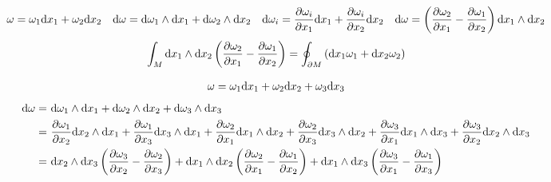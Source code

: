 \documentclass[11pt]{article}
\numberwithin{equation}{section}
\begin{document}
\begin{ex}
\begin{align}
  \w
=
  \w_1
  \mr{d}x_1
+
  \w_2
  \mr{d}x_2
&&
  \mr{d}\w
=
  \mr{d}\w_1\wedge\mr{d}x_1
+
  \mr{d}\w_2\wedge\mr{d}x_2
&&
  \mr{d}\w_i
=
  \pd{\w_i}{x_1}
  \mr{d}x_1
+
  \pd{\w_i}{x_2}
  \mr{d}x_2
&&
  \mr{d}\w
=
  \pr{
    \pd{\w_2}{x_1}
  -
    \pd{\w_1}{x_2}
  }
  \mr{d}x_1\wedge\mr{d}x_2
\end{align}
\begin{align}
  \int_M
  \mr{d}x_1\wedge\mr{d}x_2
  \pr{
    \pd{\w_2}{x_1}
  -
    \pd{\w_1}{x_2}
  }
=
  \oint_{\pt M}
  \pr{
    \mr{d}x_1
    \w_1
  +
    \mr{d}x_2
    \w_2
  }
\end{align}
\end{ex}

\begin{ex}
\begin{align}
  \w
=
  \w_1
  \mr{d}x_1
+
  \w_2
  \mr{d}x_2
+
  \w_3
  \mr{d}x_3
\end{align}
\begin{align}
  \mr{d}\w
=&\
  \mr{d}\w_1
  \wedge
  \mr{d}x_1
+
  \mr{d}\w_2
  \wedge
  \mr{d}x_2
+
  \mr{d}\w_3
  \wedge
  \mr{d}x_3
\\=&\
  \pd{\w_1}{x_2}
  \mr{d}x_2
  \wedge
  \mr{d}x_1
+
  \pd{\w_1}{x_3}
  \mr{d}x_3
  \wedge
  \mr{d}x_1
+
  \pd{\w_2}{x_1}
  \mr{d}x_1
  \wedge
  \mr{d}x_2
+
  \pd{\w_2}{x_3}
  \mr{d}x_3
  \wedge
  \mr{d}x_2
+
  \pd{\w_3}{x_1}
  \mr{d}x_1
  \wedge
  \mr{d}x_3
+
  \pd{\w_3}{x_2}
  \mr{d}x_2
  \wedge
  \mr{d}x_3
\\=&\
  \mr{d}x_2
  \wedge
  \mr{d}x_3
  \pr{
    \pd{\w_3}{x_2}
  -
    \pd{\w_2}{x_3}
  }
+
  \mr{d}x_1
  \wedge
  \mr{d}x_2
  \pr{
    \pd{\w_2}{x_1}
  -
    \pd{\w_1}{x_2}
  }
+
  \mr{d}x_1
  \wedge
  \mr{d}x_3
  \pr{
    \pd{\w_3}{x_1}
  -
    \pd{\w_1}{x_3}
  }
\end{align}
\end{ex}


\newpage
\end{document}
